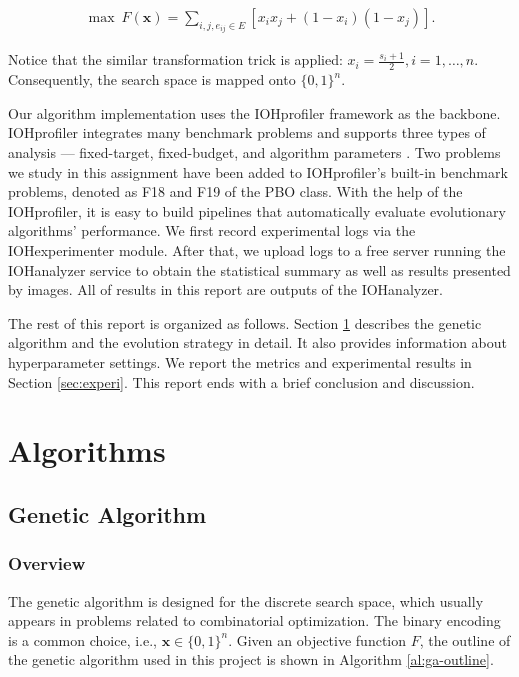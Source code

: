 \documentclass{article}
\begin{document}
\begin{align*}
    \max\ F\left( \mathbf{x} \right) = \sum_{i, j, e_{ij}\in E} \left[ x_ix_j + \left( 1 - x_i \right)\left( 1 - x_j \right) \right].
\end{align*}

Notice that the similar transformation trick is applied: $x_i = \frac{s_i + 1}{2}, i = 1, \dots, n$. Consequently, the search space is mapped onto $\{0, 1\}^n$.

Our algorithm implementation uses the IOHprofiler framework as the backbone. IOHprofiler integrates many benchmark problems and supports three types of analysis --- fixed-target, fixed-budget, and algorithm parameters \cite{2018doerr}. Two problems we study in this assignment have been added to IOHprofiler's built-in benchmark problems, denoted as F18 and F19 of the PBO class. With the help of the IOHprofiler, it is easy to build pipelines that automatically evaluate evolutionary algorithms' performance. We first record experimental logs via the IOHexperimenter module. After that, we upload logs to a free server running the IOHanalyzer service to obtain the statistical summary as well as results presented by images. All of results in this report are outputs of the IOHanalyzer.

The rest of this report is organized as follows. Section \ref{sec:imple} describes the genetic algorithm and the evolution strategy in detail. It also provides information about hyperparameter settings. We report the metrics and experimental results in Section \ref{sec:experi}. This report ends with a brief conclusion and discussion.


\section{Algorithms}
\label{sec:imple}
\subsection{Genetic Algorithm}
\subsubsection{Overview}
\label{subsubsec:overview}
The genetic algorithm is designed for the discrete search space, which usually appears in problems related to combinatorial optimization. The binary encoding is a common choice, i.e., $\mathbf{x}\in \{0, 1\}^n$. Given an objective function $F$, the outline of the genetic algorithm used in this project is shown in Algorithm \ref{al:ga-outline}.
\end{document}
